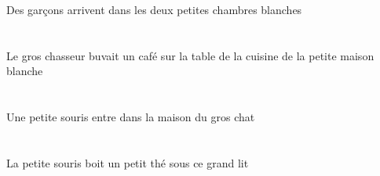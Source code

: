 \begin{exe}
 Des garçons arrivent dans les deux petites chambres blanches
\ex\glll
    \DEFSgObl{}    \DEFSgObl{}    \DEFSgObl{}   \petitDSg{}   \blancDSg{}   \maisonDSgObl{}   \DE{}   \cuisineDSgObl{}   \DE{}   \tableDSgObl{}   \SUR{}   \DEFSgErg{}   \grosCSg{}   \chasseurCSgErg{}   \INDSgAbs{}   \cafeCSgAbs{}  \boireVtPstCSg{} \\
    \DEFSgOblP{}    \DEFSgOblP{}    \DEFSgOblP{}   \petitDSgP{}   \blancDSgP{}   \maisonDSgOblP{}   \DEP{}   \cuisineDSgOblP{}   \DEP{}   \tableDSgOblP{}   \SURP{}   \DEFSgErgP{}   \grosCSgP{}   \chasseurCSgErgP{}   \INDSgAbsP{}   \cafeCSgAbsP{}  \boireVtPstCSgP{} \\
    \DEFSgOblG{}    \DEFSgOblG{}    \DEFSgOblG{}   \petitDSgG{}   \blancDSgG{}   \maisonDSgOblG{}   \DEG{}   \cuisineDSgOblG{}   \DEG{}   \tableDSgOblG{}   \SURG{}   \DEFSgErgG{}   \grosCSgG{}   \chasseurCSgErgG{}   \INDSgAbsG{}   \cafeCSgAbsG{}  \boireVtPstCSgG{} \\
 Le gros chasseur buvait un café sur la table de la cuisine de la petite maison blanche
\ex\glll
   \INDSgAbs{}   \petitBSg{}   \sourisBSgAbs{}    \DEFSgObl{}    \DEFSgObl{}   \grosDSg{}   \chatDSgObl{}   \DE{}   \maisonDSgObl{}   \DANS{}  \entrerViPrsBSg{} \\
   \INDSgAbsP{}   \petitBSgP{}   \sourisBSgAbsP{}    \DEFSgOblP{}    \DEFSgOblP{}   \grosDSgP{}   \chatDSgOblP{}   \DEP{}   \maisonDSgOblP{}   \DANSP{}  \entrerViPrsBSgP{} \\
   \INDSgAbsG{}   \petitBSgG{}   \sourisBSgAbsG{}    \DEFSgOblG{}    \DEFSgOblG{}   \grosDSgG{}   \chatDSgOblG{}   \DEG{}   \maisonDSgOblG{}   \DANSG{}  \entrerViPrsBSgG{} \\
 Une petite souris entre dans la maison du gros chat
\ex\glll
    \DEMSgObl{}   \grandDSg{}   \litDSgObl{}   \SOUS{}   \DEFSgErg{}   \petitBSg{}   \sourisBSgErg{}   \INDSgAbs{}   \petitBSg{}   \theBSgAbs{}  \boireVtPrsBSg{} \\
    \DEMSgOblP{}   \grandDSgP{}   \litDSgOblP{}   \SOUSP{}   \DEFSgErgP{}   \petitBSgP{}   \sourisBSgErgP{}   \INDSgAbsP{}   \petitBSgP{}   \theBSgAbsP{}  \boireVtPrsBSgP{} \\
    \DEMSgOblG{}   \grandDSgG{}   \litDSgOblG{}   \SOUSG{}   \DEFSgErgG{}   \petitBSgG{}   \sourisBSgErgG{}   \INDSgAbsG{}   \petitBSgG{}   \theBSgAbsG{}  \boireVtPrsBSgG{} \\
 La petite souris boit un petit thé sous ce grand lit
\ex\glll
    \INDPlObl{}   \coussinBPlObl{}   \SUR{}   \DEFPlErg{}   \grosCPl{}   \chasseurCPlErg{}   \INDSgAbs{}   \petitBSg{}   \noirBSg{}   \autrucheBSgAbs{}  \mangerVtPstBSg{} \\

\end{exe}
